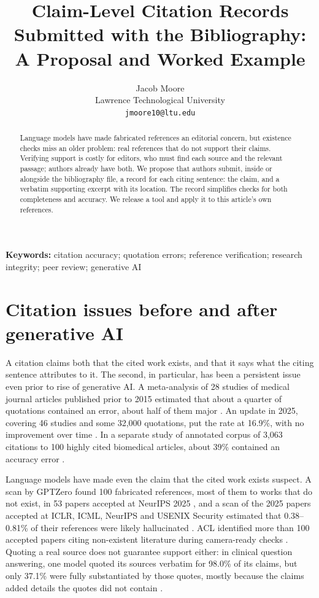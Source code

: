 \documentclass[11pt]{article}
\title{Claim-Level Citation Records Submitted with the Bibliography:\\A Proposal and Worked Example}
\author{Jacob Moore\\Lawrence Technological University\\\texttt{jmoore10@ltu.edu}}
\date{}
\begin{document}
\maketitle

\begin{abstract}
Language models have made fabricated references an editorial concern, but existence checks miss an older problem: real references that do not support their claims. Verifying support is costly for editors, who must find each source and the relevant passage; authors already have both. We propose that authors submit, inside or alongside the bibliography file, a record for each citing sentence: the claim, and a verbatim supporting excerpt with its location. The record simplifies checks for both completeness and accuracy. We release a tool and apply it to this article's own references.
\end{abstract}

\noindent\textbf{Keywords:} citation accuracy; quotation errors; reference verification; research integrity; peer review; generative AI

\section{Citation issues before and after generative AI}

A citation claims both that the cited work exists, and that it says what the citing sentence attributes to it. The second, in particular, has been a persistent issue even prior to rise of generative AI. A meta-analysis of 28 studies of medical journal articles published prior to 2015 estimated that about a quarter of quotations contained an error, about half of them major \citep{jergas2015quotation}. An update in 2025, covering 46 studies and some 32,000 quotations, put the rate at 16.9\%, with no improvement over time \citep{baethge2025quotation}. In a separate study of annotated corpus of 3,063 citations to 100 highly cited biomedical articles, about 39\% contained an accuracy error \citep{sarol2024citationintegrity}.

Language models have made even the claim that the cited work exists suspect. A scan by GPTZero found 100 fabricated references, most of them to works that do not exist, in 53 papers accepted at NeurIPS 2025 \citep{ansari2026compound}, and a scan of the 2025 papers accepted at ICLR, ICML, NeurIPS and USENIX Security estimated that 0.38--0.81\% of their references were likely hallucinated \citep{russinovich2026phantom}. ACL identified more than 100 accepted papers citing non-existent literature during camera-ready checks \citep{acl2026statement}. Quoting a real source does not guarantee support either: in clinical question answering, one model quoted its sources verbatim for 98.0\% of its claims, but only 37.1\% were fully substantiated by those quotes, mostly because the claims added details the quotes did not contain \citep{zhang2026verifiable}.
\end{document}
